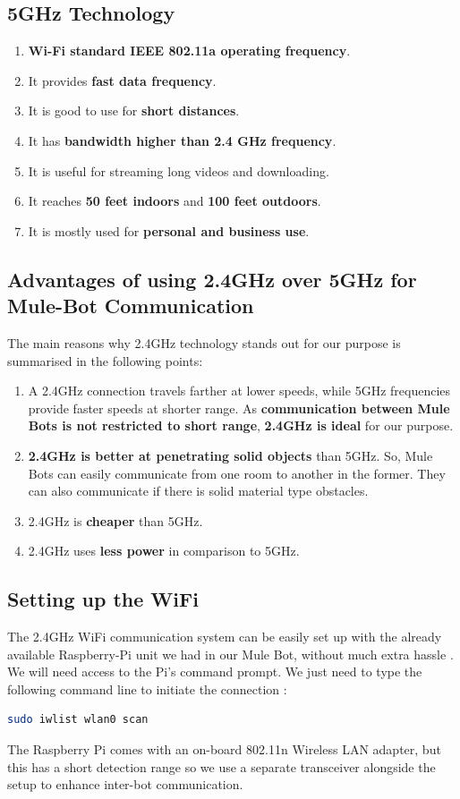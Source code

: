 \documentclass{article}
\begin{document}
\subsection{5GHz Technology}
\begin{enumerate}
\item \textbf{Wi-Fi standard IEEE 802.11a operating frequency}.
\item It provides \textbf{fast data frequency}.
\item It is good to use for \textbf{short distances}.
\item It has \textbf{bandwidth higher than 2.4 GHz frequency}.
\item It is useful for streaming long videos and downloading.
\item It reaches \textbf{50 feet indoors} and \textbf{100 feet outdoors}.
\item It is mostly used for \textbf{personal and business use}.
\end{enumerate}

\subsection{Advantages of using 2.4GHz over 5GHz for Mule-Bot Communication}
The main reasons why 2.4GHz technology stands out for our purpose is summarised in the following points:
\begin{enumerate}
\item A 2.4GHz connection travels farther at lower speeds, while 5GHz frequencies provide faster speeds at shorter range. As \textbf{communication between Mule Bots is not restricted to short range}, \textbf{2.4GHz is ideal} for our purpose.
\item \textbf{2.4GHz is better at penetrating solid objects} than 5GHz. \cite{WiFi_comparison} So, Mule Bots can easily communicate from one room to another in the former. They can also communicate if there is solid material type obstacles.
\item 2.4GHz is \textbf{cheaper} than 5GHz.
\item 2.4GHz uses \textbf{less power} in comparison to 5GHz.
\end{enumerate}

\subsection{Setting up the WiFi}
The 2.4GHz WiFi communication system can be easily set up with the already available Raspberry-Pi unit we had in our Mule Bot, without much extra hassle \cite{Setting_up_wifi}. We will need access to the Pi’s command prompt. We just need to type the following command line to initiate the connection \cite{wifi_rpi3}:
\begin{lstlisting}[language=Bash]
sudo iwlist wlan0 scan
\end{lstlisting}
The Raspberry Pi comes with an on-board 802.11n Wireless LAN adapter, but this has a short detection range so we use a separate transceiver \cite{transceiver} alongside the setup to enhance inter-bot communication.
\newpage
\end{document}
